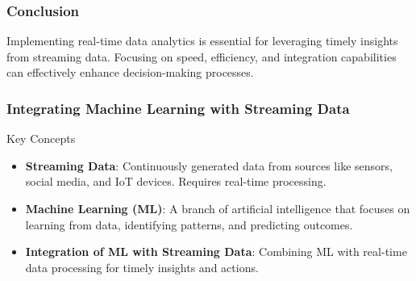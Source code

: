\documentclass[aspectratio=169]{beamer}
\begin{document}
\begin{frame}
    \frametitle{Conclusion}
    Implementing real-time data analytics is essential for leveraging timely insights from streaming data. Focusing on speed, efficiency, and integration capabilities can effectively enhance decision-making processes.
\end{frame}

\begin{frame}
    \frametitle{Integrating Machine Learning with Streaming Data}
    \begin{block}{Key Concepts}
        \begin{itemize}
            \item \textbf{Streaming Data}: Continuously generated data from sources like sensors, social media, and IoT devices. Requires real-time processing.
            \item \textbf{Machine Learning (ML)}: A branch of artificial intelligence that focuses on learning from data, identifying patterns, and predicting outcomes.
            \item \textbf{Integration of ML with Streaming Data}: Combining ML with real-time data processing for timely insights and actions.
        \end{itemize}
    \end{block}
\end{frame}
\end{document}
